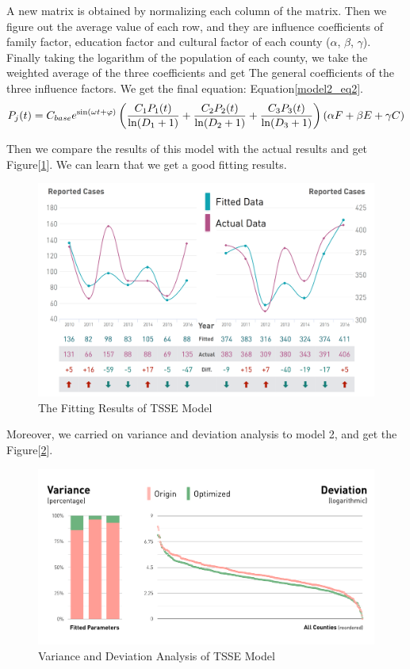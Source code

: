 \documentclass{mcmthesis}
\begin{document}
A new matrix is obtained by normalizing each column of the matrix. Then we figure out the average value of each row, and they are influence coefficients of family factor, education factor and cultural factor of each county ($\alpha$, $\beta$, $\gamma$). Finally taking the logarithm of the population of each county, we take the weighted average of the three coefficients and get The general coefficients of the three influence factors. We get the final equation: Equation\eqref{model2_eq2}.
\begin{equation}
P_{j}(t) = C_{base} e^{\sin (\omega t+\varphi)} \left(\frac{C_1 P_1(t)}{\ln (D_1+1)}+\frac{C_2 P_2(t)}{\ln (D_2+1)}+\frac{C_3 P_3(t)}{\ln (D_3+1)}\right)\left(\alpha\*F+\beta\*E+\gamma\*C\right)
\label{model2_eq2}
\end{equation}

Then we compare the results of this model with the actual results and get Figure[\ref{model2_results}]. We can learn that we get a good fitting results.

\begin{figure}[h]
	\centering
	\includegraphics[width=15cm]{figure-release/Model2.FittingResult.png}
	\caption{The Fitting Results of TSSE Model}\label{model2_results}
\end{figure}

Moreover, we carried on variance and deviation analysis to model 2, and get the Figure[\ref{model2_vd}].
\begin{figure}[h]
	\centering
	\includegraphics[width=13cm]{figure-release/Model2.Evaluation.png}
	\caption{Variance and Deviation Analysis of TSSE Model}\label{model2_vd}
\end{figure}
\end{document}
